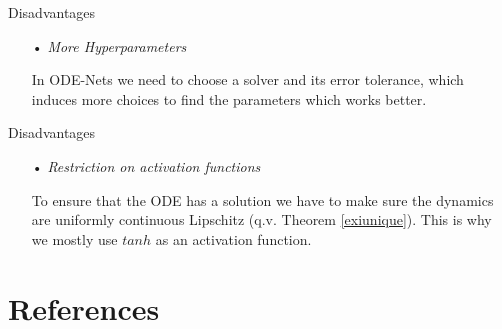\documentclass[11pt]{beamer}
\begin{document}
\begin{frame}{Disadvantages}
\begin{itemize}
\item[•] \textit{More Hyperparameters}

In ODE-Nets we need to choose a solver and its error tolerance, which induces more choices to find the parameters which works better.
\end{itemize}
\end{frame}

\begin{frame}{Disadvantages}
\begin{itemize}
\item[•] \textit{Restriction on activation functions}

To ensure that the ODE has a solution we have to make sure the dynamics are uniformly continuous Lipschitz (q.v. Theorem \ref{exiunique}). This is why we mostly use $tanh$ as an activation function.
\end{itemize}
\end{frame}

\section{References}


\begin{frame}[allowframebreaks]




\end{frame}
\end{document}
